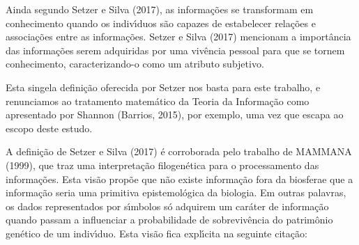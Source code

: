 \documentclass[
12pt,		%
openright,	%
twoside,  %
a4paper,			%
chapter=TITLE,		%
english,			%
french,				%
spanish,			%
brazil				%
]{USPSC-classe/USPSC}
\begin{document}
Ainda segundo Setzer e Silva (2017), as informa\c{c}\~oes se transformam em conhecimento quando os indiv\'{\i}duos s\~ao capazes de estabelecer rela\c{c}\~oes e associa\c{c}\~oes entre as informa\c{c}\~oes.  Setzer e Silva (2017) mencionam a import\^ancia das informa\c{c}\~oes serem adquiridas por uma viv\^encia pessoal para que se tornem conhecimento, caracterizando-o como um atributo subjetivo.










Esta singela defini\c{c}\~ao oferecida por Setzer nos basta para este trabalho, e renunciamos ao tratamento matem\'atico da Teoria da Informa\c{c}\~ao como apresentado por Shannon (Barrios, 2015), por exemplo, uma vez que escapa ao escopo deste estudo.










A defini\c{c}\~ao de Setzer e Silva (2017) \'e corroborada pelo trabalho de MAMMANA (1999), que traz uma interpreta\c{c}\~ao filogen\'etica para o processamento das informa\c{c}\~oes. Esta vis\~ao prop\~oe que \textquotedbl n\~ao existe informa\c{c}\~ao fora da biosfera\textquotedbl  e que a informa\c{c}\~ao seria uma primitiva epistemol\'ogica da biologia. Em outras palavras, os dados representados por s\'{\i}mbolos s\'o adquirem um car\'ater de informa\c{c}\~ao quando passam a influenciar a probabilidade de sobreviv\^encia do patrim\^onio gen\'etico de um indiv\'{\i}duo. Esta vis\~ao fica expl\'{\i}cita na seguinte cita\c{c}\~ao:











\noindent\begin{center}\mbox{\centering{}}\end{center}
\end{document}
